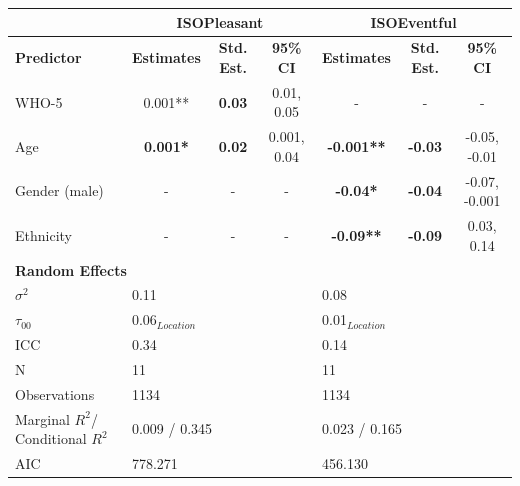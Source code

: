 {\begin{landscape}
\begin{table}[ht]
    \begin{tabular}{@{}lcccccc@{}}
    \toprule
                      & \multicolumn{3}{c|}{\textbf{ISOPleasant}}                                        & \multicolumn{3}{c}{\textbf{ISOEventful}}                   \\ 
    \midrule
    \textbf{Predictor} & \textbf{Estimates} & \textbf{Std. Est.} & \multicolumn{1}{c|}{\textbf{95\% CI}} & \textbf{Estimates} & \textbf{Std. Est.} & \textbf{95\% CI} \\
    WHO-5              & 0.001**            & \textbf{0.03}      & \multicolumn{1}{c|}{0.01, 0.05}       & -                  & -                  & -                \\
    Age                & \textbf{0.001*}    & \textbf{0.02}      & \multicolumn{1}{c|}{0.001, 0.04}      & \textbf{-0.001**}  & \textbf{-0.03}     & -0.05, -0.01     \\
    Gender (male)      & -                  & -                  & \multicolumn{1}{c|}{-}                & \textbf{-0.04*}    & \textbf{-0.04}     & -0.07, -0.001    \\
    Ethnicity          & -                  & -                  & \multicolumn{1}{c|}{-}                & \textbf{-0.09**}   & \textbf{-0.09}     & 0.03, 0.14       \\
    \midrule
    \multicolumn{7}{l}{\textbf{Random Effects}} \\ 
    \midrule
    $\sigma^2$         & \multicolumn{3}{l|}{0.11}               & \multicolumn{3}{l}{0.08}              \\
    $\tau_{00}$        & \multicolumn{3}{l|}{0.06$_{Location}$}  & \multicolumn{3}{l}{0.01$_{Location}$} \\
    ICC                & \multicolumn{3}{l|}{0.34}               & \multicolumn{3}{l}{0.14}              \\
    N                  & \multicolumn{3}{l|}{11}                 & \multicolumn{3}{l}{11}                \\
    \midrule
    Observations       & \multicolumn{3}{l|}{1134}               & \multicolumn{3}{l}{1134}          \\
    Marginal $R^2$/%
    Conditional $R^2$  & \multicolumn{3}{l|}{0.009 / 0.345}      & \multicolumn{3}{l}{0.023 / 0.165} \\
    AIC                & \multicolumn{3}{l|}{778.271}            & \multicolumn{3}{l}{456.130}       \\
    \bottomrule
    \end{tabular}
    \end{table}
    \end{landscape}
  }


